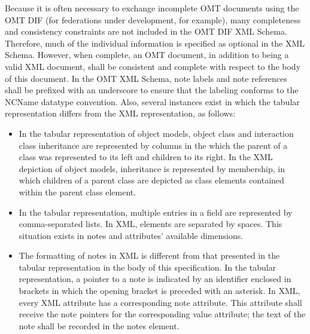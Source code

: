 Because it is often necessary to exchange incomplete OMT documents using the OMT DIF (for federations under development, for example), many completeness and consistency constraints are not included in the OMT DIF XML Schema. Therefore, much of the individual information is specified as optional in the XML Schema. However, when complete, an OMT document, in addition to being a valid XML document, shall be consistent and complete with respect to the body of this document. In the OMT XML Schema, note labels and note references shall be prefixed with an underscore to ensure that the labeling conforms to the NCName datatype convention. Also, several instances exist in which the tabular representation differs from the XML representation, as follows:
\begin{itemize}[leftmargin=30pt,labelsep=9pt,itemsep=1.4pt,topsep=2pt]
\item In the tabular representation of object models, object class and interaction class inheritance are represented by columns in the which the parent of a class was represented to its left and children to its right. In the XML depiction of object models, inheritance is represented by membership, in which children of a parent class are depicted as class elements contained within the parent class element.
\item In the tabular representation, multiple entries in a field are represented by comma-separated lists. In XML, elements are separated by spaces. This situation exists in notes and attributes' available dimensions.
\end{itemize}
\endgroup

\newpage
\begingroup
\annexbodyfont
\setlength{\parskip}{9.8pt plus 0.8pt minus 0.8pt}
\begin{itemize}[leftmargin=32pt,labelsep=12pt,itemsep=1.4pt,topsep=0pt]
\item The formatting of notes in XML is different from that presented in the tabular representation in the body of this specification. In the tabular representation, a pointer to a note is indicated by an identifier enclosed in brackets in which the opening bracket is preceded with an asterisk. In XML, every XML attribute has a corresponding note attribute. This attribute shall receive the note pointers for the corresponding value attribute; the text of the note shall be recorded in the notes element.
\end{itemize}

